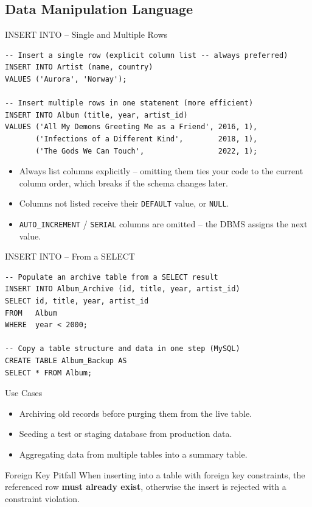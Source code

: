 \subsection{Data Manipulation Language}

\begin{frame}[fragile]{INSERT INTO -- Single and Multiple Rows}
  \begin{lstlisting}[style=sqlstyle]
-- Insert a single row (explicit column list -- always preferred)
INSERT INTO Artist (name, country)
VALUES ('Aurora', 'Norway');

-- Insert multiple rows in one statement (more efficient)
INSERT INTO Album (title, year, artist_id)
VALUES ('All My Demons Greeting Me as a Friend', 2016, 1),
       ('Infections of a Different Kind',        2018, 1),
       ('The Gods We Can Touch',                 2022, 1);
  \end{lstlisting}

  \begin{itemize}
    \item Always list columns explicitly -- omitting them ties your code to the current
          column order, which breaks if the schema changes later.
    \item Columns not listed receive their \texttt{DEFAULT} value, or \texttt{NULL}.
    \item \texttt{AUTO\_INCREMENT} / \texttt{SERIAL} columns are omitted -- the DBMS assigns the next value.
  \end{itemize}
\end{frame}

\begin{frame}[fragile]{INSERT INTO -- From a SELECT}
  \begin{lstlisting}[style=sqlstyle]
-- Populate an archive table from a SELECT result
INSERT INTO Album_Archive (id, title, year, artist_id)
SELECT id, title, year, artist_id
FROM   Album
WHERE  year < 2000;

-- Copy a table structure and data in one step (MySQL)
CREATE TABLE Album_Backup AS
SELECT * FROM Album;
  \end{lstlisting}

  \begin{block}{Use Cases}
    \begin{itemize}
      \item Archiving old records before purging them from the live table.
      \item Seeding a test or staging database from production data.
      \item Aggregating data from multiple tables into a summary table.
    \end{itemize}
  \end{block}

  \begin{alertblock}{Foreign Key Pitfall}
    When inserting into a table with foreign key constraints, the referenced row
    \textbf{must already exist}, otherwise the insert is rejected with a constraint violation.
  \end{alertblock}
\end{frame}

